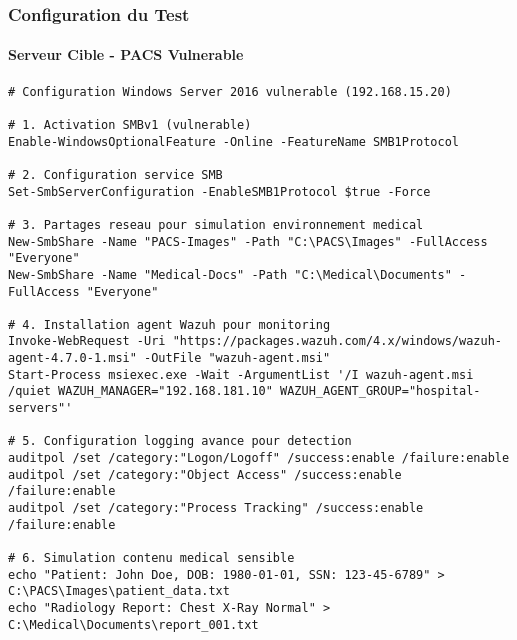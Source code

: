 \subsubsection{Configuration du Test}

\paragraph{Serveur Cible - PACS Vulnerable}
\begin{lstlisting}[style=bashstyle,caption=Configuration du serveur PACS pour test EternalBlue]
# Configuration Windows Server 2016 vulnerable (192.168.15.20)

# 1. Activation SMBv1 (vulnerable)
Enable-WindowsOptionalFeature -Online -FeatureName SMB1Protocol

# 2. Configuration service SMB
Set-SmbServerConfiguration -EnableSMB1Protocol $true -Force

# 3. Partages reseau pour simulation environnement medical
New-SmbShare -Name "PACS-Images" -Path "C:\PACS\Images" -FullAccess "Everyone"
New-SmbShare -Name "Medical-Docs" -Path "C:\Medical\Documents" -FullAccess "Everyone"

# 4. Installation agent Wazuh pour monitoring
Invoke-WebRequest -Uri "https://packages.wazuh.com/4.x/windows/wazuh-agent-4.7.0-1.msi" -OutFile "wazuh-agent.msi"
Start-Process msiexec.exe -Wait -ArgumentList '/I wazuh-agent.msi /quiet WAZUH_MANAGER="192.168.181.10" WAZUH_AGENT_GROUP="hospital-servers"'

# 5. Configuration logging avance pour detection
auditpol /set /category:"Logon/Logoff" /success:enable /failure:enable
auditpol /set /category:"Object Access" /success:enable /failure:enable
auditpol /set /category:"Process Tracking" /success:enable /failure:enable

# 6. Simulation contenu medical sensible
echo "Patient: John Doe, DOB: 1980-01-01, SSN: 123-45-6789" > C:\PACS\Images\patient_data.txt
echo "Radiology Report: Chest X-Ray Normal" > C:\Medical\Documents\report_001.txt
\end{lstlisting}

